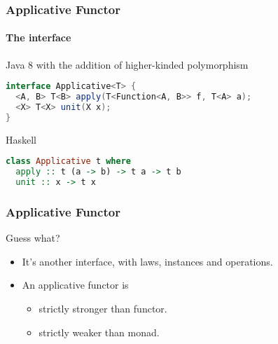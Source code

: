 \begin{frame}[fragile]
\frametitle{Applicative Functor}
\framesubtitle{The interface}
\begin{block}{Java 8 with the addition of higher-kinded polymorphism}
\begin{lstlisting}[style=language,language=java]
interface Applicative<T> {
  <A, B> T<B> apply(T<Function<A, B>> f, T<A> a);
  <X> T<X> unit(X x);
}
\end{lstlisting}
\end{block}
\begin{block}{Haskell}
\begin{lstlisting}[style=language,language=haskell]
class Applicative t where
  apply :: t (a -> b) -> t a -> t b
  unit :: x -> t x
\end{lstlisting}
\end{block}
\end{frame}

\begin{frame}[fragile]
\frametitle{Applicative Functor}
\begin{block}{Guess what?}
\begin{itemize}
\item It's another interface, with laws, instances and operations.
\item An applicative functor is
  \begin{itemize}
  \item strictly stronger than functor.
  \item strictly weaker than monad.
  \end{itemize}
\end{itemize}
\end{block}
\end{frame}
